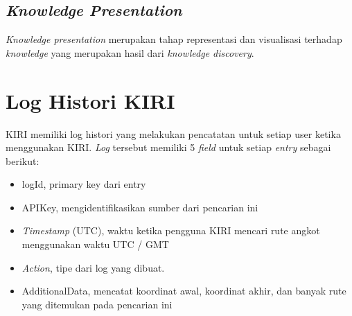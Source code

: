 \subsection{\textsl{Knowledge Presentation}}
\textsl{Knowledge presentation} merupakan tahap representasi dan visualisasi terhadap \textsl{knowledge} yang merupakan hasil dari \textsl{knowledge discovery}.	

\section{Log Histori KIRI}

KIRI memiliki log histori yang melakukan pencatatan untuk setiap user ketika menggunakan KIRI. \textsl{Log} tersebut memiliki 5 \textsl{field} untuk setiap \textsl{entry} sebagai berikut:
\begin{itemize}
	\item logId, primary key dari entry
	\item APIKey, mengidentifikasikan sumber dari pencarian ini
	\item \textsl{Timestamp} (UTC), waktu ketika pengguna KIRI mencari rute angkot menggunakan waktu UTC / GMT
	\item \textsl{Action}, tipe dari log yang dibuat.
	\item AdditionalData, mencatat koordinat awal, koordinat akhir, dan banyak rute yang ditemukan pada pencarian ini
\end{itemize}

